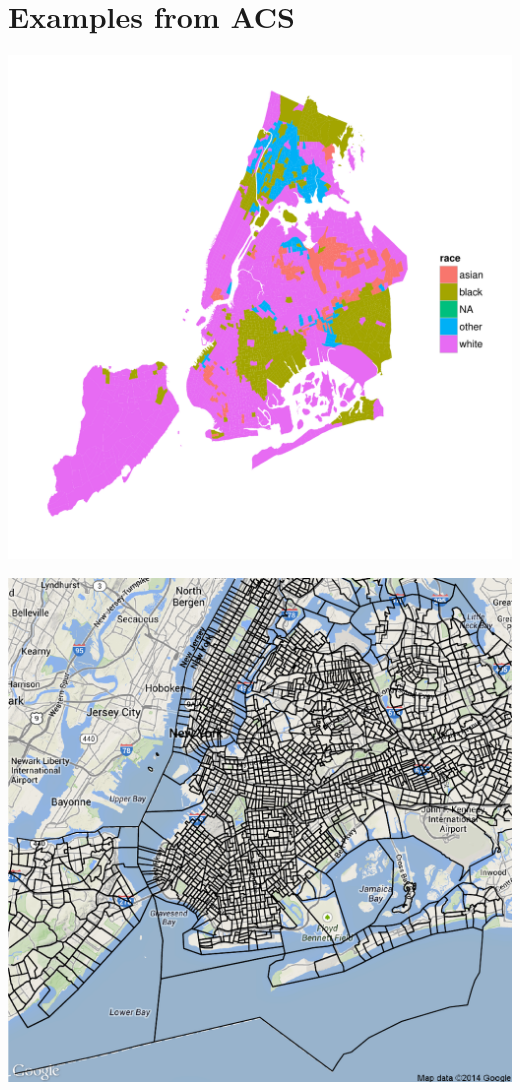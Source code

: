 \documentclass{article}\usepackage[]{graphicx}\usepackage[]{color}
\makeatletter
\def\maxwidth{ %
  \ifdim\Gin@nat@width>\linewidth
    \linewidth
  \else
    \Gin@nat@width
  \fi
}
\newenvironment{knitrout}{}{} %
\makeatother
\begin{document}
\section{Examples from ACS}
\begin{knitrout}
\color{fgcolor}
\includegraphics[width=\maxwidth]{figure/NY} 

\end{knitrout}


\begin{knitrout}
\color{fgcolor}
\includegraphics[width=\maxwidth]{figure/test} 

\end{knitrout}
\end{document}
